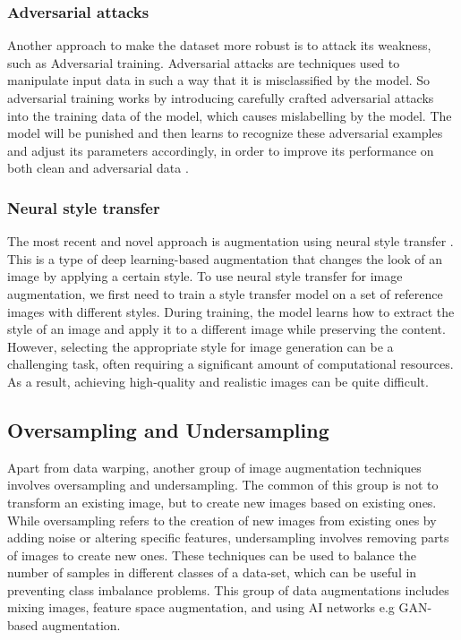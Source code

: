 \subsubsection{Adversarial attacks}
Another approach to make the dataset more robust is to attack its weakness, such as Adversarial training. Adversarial attacks are techniques used to manipulate input data in such a way that it is misclassified by the model. So adversarial training works by introducing carefully crafted adversarial attacks into the training data of the model, which causes mislabelling by the model. The model will be punished and then learns to recognize these adversarial examples and adjust its parameters accordingly, in order to improve its performance on both clean and adversarial data \cite{shrivastava2017learning}. 

\subsubsection{Neural style transfer}
The most recent and novel approach is augmentation using neural style transfer \cite{gatys2015neural}. This is a type of deep learning-based augmentation that changes the look of an image by applying a certain style. To use neural style transfer for image augmentation, we first need to train a style transfer model on a set of reference images with different styles. During training, the model learns how to extract the style of an image and apply it to a different image while preserving the content. However, selecting the appropriate style for image generation can be a challenging task, often requiring a significant amount of computational resources. As a result, achieving high-quality and realistic images can be quite difficult.

\subsection{Oversampling and Undersampling}
Apart from data warping, another group of image augmentation techniques involves oversampling and undersampling. The common of this group is not to transform an existing image, but to create new images based on existing ones. While oversampling refers to the creation of new images from existing ones by adding noise or altering specific features, undersampling involves removing parts of images to create new ones. These techniques can be used to balance the number of samples in different classes of a data-set, which can be useful in preventing class imbalance problems. This group of data augmentations includes mixing images, feature space augmentation, and using AI networks e.g GAN-based augmentation.

